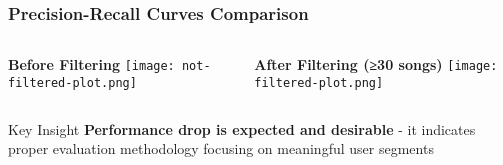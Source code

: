 \documentclass[11pt]{beamer}
\begin{document}
\begin{frame}
\frametitle{Precision-Recall Curves Comparison}
\begin{columns}
\begin{column}{0.5\textwidth}
\begin{center}
\textbf{Before Filtering}
\texttt{[image: not-filtered-plot.png]}
\small

\end{center}
\end{column}
\begin{column}{0.5\textwidth}
\begin{center}
\textbf{After Filtering (≥30 songs)}
\texttt{[image: filtered-plot.png]}
\small

\end{center}
\end{column}
\end{columns}

\begin{block}{Key Insight}
\textbf{Performance drop is expected and desirable} - it indicates proper evaluation methodology focusing on meaningful user segments
\end{block}
\end{frame}
\end{document}
